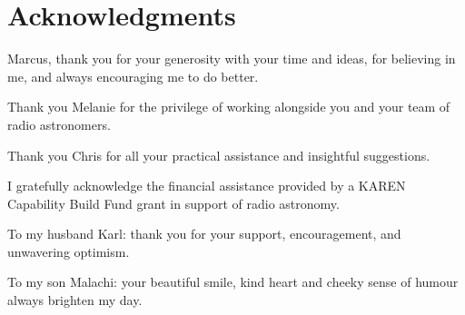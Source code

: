 \chapter*{Acknowledgments}\label{C:ack} 

Marcus, thank you for your generosity with your time and ideas, for believing in me, and always encouraging me to do better.

Thank you Melanie for the privilege of working alongside you and your team of radio astronomers.

Thank you Chris for all your practical assistance and insightful suggestions.

I gratefully acknowledge the financial assistance provided by a KAREN Capability Build Fund grant in support of radio astronomy.

To my husband Karl: thank you for your support, encouragement, and unwavering optimism.

To my son Malachi: your beautiful smile, kind heart and cheeky sense of humour always brighten my day.
